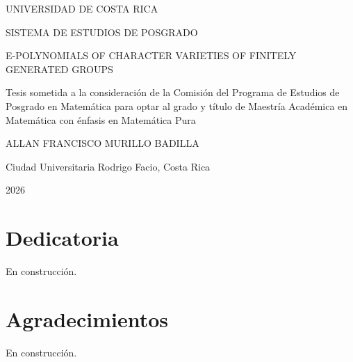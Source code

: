 \documentclass[12pt,oneside]{book}
\theoremstyle{definition}
\begin{document}
\thispagestyle{empty}



\pagestyle{fancy}
\fancyfoot[c]{\thepage}
\frontmatter

\begin{center}


{\Large UNIVERSIDAD DE COSTA RICA}

{\Large SISTEMA DE ESTUDIOS DE POSGRADO}

\vspace{3cm}
{\Large E-POLYNOMIALS OF CHARACTER VARIETIES OF FINITELY GENERATED GROUPS} %

\vspace{3cm}
{\Large Tesis sometida a la consideración de la Comisión del Programa de Estudios de Posgrado en Matemática para optar al grado y título de Maestría Académica en Matemática con énfasis en Matemática Pura}

 

\vspace{3cm}
{\Large ALLAN FRANCISCO MURILLO BADILLA} %


\vspace{3cm}
{\large Ciudad Universitaria Rodrigo Facio, Costa Rica}

\vspace{1.5cm}
{\large 2026}


\end{center}


\newpage


\chapter*{Dedicatoria}

En construcción.

\newpage


\chapter*{Agradecimientos}

En construcción.

\newpage
\end{document}
